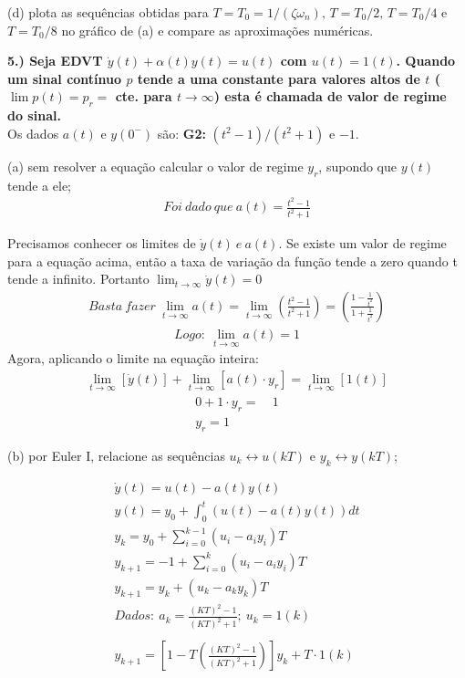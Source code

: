 \documentclass[10pt]{article}
\begin{document}
(d) plota as sequências obtidas para $T = T_0 = 1 / (\zeta \omega_n), \, T = T_0/2, \, T = T_0/4$ e $T = T_0/8$ no gráfico de (a) e compare as aproximações numéricas.


\vspace{\baselineskip}

\textbf{5.) Seja EDVT $\dot{y}(t) + \alpha(t)y(t) = u(t)$ com $u(t) = 1(t)$. Quando um sinal contínuo $p$ tende a uma constante para valores altos de $t$ ($\lim p(t) = p_r = $ cte. para $t \to \infty$) esta é chamada de valor de regime do sinal.}\\
Os dados $a(t)$ e $y(0^-)$ são: \textbf{G2: }$(t^2 - 1)/(t^2 + 1)$ e $-1$.

(a) sem resolver a equação calcular o valor de regime $y_r$, supondo que $y(t)$ tende a ele;
\begin{align*}
    Foi\ dado\ que\ a(t) = \frac{t^2-1}{t^2+1} 
\end{align*}

Precisamos conhecer os limites de $ \dot{y}(t)\ e\ a(t) $.
Se existe um valor de regime para a equação acima, então a taxa de variação da função tende a zero
quando t tende a infinito. Portanto $ \lim_{t\to\infty} \dot{y}(t) = 0 $
\begin{align*}
    Basta\ fazer\ \lim_{t\to\infty} a(t) = \lim_{t\to\infty} \left( \frac{t^2-1}{t^2+1} \right) = \left( \frac{1-\frac{1}{t^2}}{1+\frac{1}{t^2}} \right)
\end{align*}
\begin{align*}
    Logo:\ \lim_{t\to\infty} a(t) = 1
\end{align*}
Agora, aplicando o limite na equação inteira:
\begin{align*}
    \lim_{t\to\infty} [\dot{y}(t)] + \lim_{t\to\infty} [a(t) \cdot y_r] = \lim_{t\to\infty} [1(t)]
\end{align*}
\begin{align*}
    0 + 1 \cdot y_r =&\ 1\\
    y_r = 1
\end{align*}

(b) por Euler I, relacione as sequências $u_k \leftrightarrow u(kT)$ e $y_k \leftrightarrow y(kT)$;

\begin{align*}
    \dot{y}(t) = u(t) - a(t)y(t)\\
    y(t) = y_{0} + \int_{0}^{t} (u(t) - a(t)y(t))dt\\
    y_k = y_0 + \sum_{i=0}^{k-1} (u_i - a_i y_i)T\\
    y_{k+1} = -1 + \sum_{i=0}^{k} (u_i - a_i y_i)T\\
    y_{k+1} = y_k + (u_k - a_k y_k)T\\
    Dados:\ a_k = \frac{(KT)^2-1}{(KT)^2+1};\ u_k = 1(k)\\ \\
    y_{k+1} = \left[ 1 - T \left( \frac{(KT)^2-1}{(KT)^2+1} \right) \right] y_k + T \cdot 1(k)
\end{align*}
\end{document}
